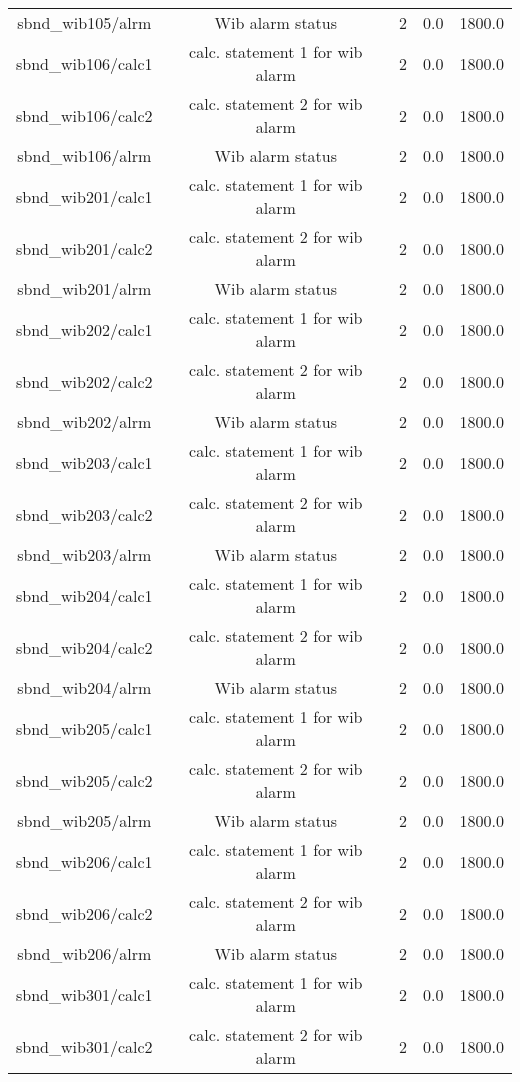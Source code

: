\begin{center}
\begin{longtable}{c | c c c c }
sbnd\_wib105/alrm & Wib alarm status & 2 & 0.0 & 1800.0\\ 
sbnd\_wib106/calc1 & calc. statement 1 for wib alarm & 2 & 0.0 & 1800.0\\ 
sbnd\_wib106/calc2 & calc. statement 2 for wib alarm & 2 & 0.0 & 1800.0\\ 
sbnd\_wib106/alrm & Wib alarm status & 2 & 0.0 & 1800.0\\ 
sbnd\_wib201/calc1 & calc. statement 1 for wib alarm & 2 & 0.0 & 1800.0\\ 
sbnd\_wib201/calc2 & calc. statement 2 for wib alarm & 2 & 0.0 & 1800.0\\ 
sbnd\_wib201/alrm & Wib alarm status & 2 & 0.0 & 1800.0\\ 
sbnd\_wib202/calc1 & calc. statement 1 for wib alarm & 2 & 0.0 & 1800.0\\ 
sbnd\_wib202/calc2 & calc. statement 2 for wib alarm & 2 & 0.0 & 1800.0\\ 
sbnd\_wib202/alrm & Wib alarm status & 2 & 0.0 & 1800.0\\ 
sbnd\_wib203/calc1 & calc. statement 1 for wib alarm & 2 & 0.0 & 1800.0\\ 
sbnd\_wib203/calc2 & calc. statement 2 for wib alarm & 2 & 0.0 & 1800.0\\ 
sbnd\_wib203/alrm & Wib alarm status & 2 & 0.0 & 1800.0\\ 
sbnd\_wib204/calc1 & calc. statement 1 for wib alarm & 2 & 0.0 & 1800.0\\ 
sbnd\_wib204/calc2 & calc. statement 2 for wib alarm & 2 & 0.0 & 1800.0\\ 
sbnd\_wib204/alrm & Wib alarm status & 2 & 0.0 & 1800.0\\ 
sbnd\_wib205/calc1 & calc. statement 1 for wib alarm & 2 & 0.0 & 1800.0\\ 
sbnd\_wib205/calc2 & calc. statement 2 for wib alarm & 2 & 0.0 & 1800.0\\ 
sbnd\_wib205/alrm & Wib alarm status & 2 & 0.0 & 1800.0\\ 
sbnd\_wib206/calc1 & calc. statement 1 for wib alarm & 2 & 0.0 & 1800.0\\ 
sbnd\_wib206/calc2 & calc. statement 2 for wib alarm & 2 & 0.0 & 1800.0\\ 
sbnd\_wib206/alrm & Wib alarm status & 2 & 0.0 & 1800.0\\ 
sbnd\_wib301/calc1 & calc. statement 1 for wib alarm & 2 & 0.0 & 1800.0\\ 
sbnd\_wib301/calc2 & calc. statement 2 for wib alarm & 2 & 0.0 & 1800.0\\ 

\end{longtable}
\end{center}
